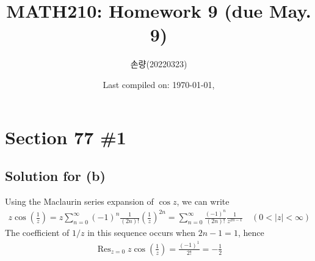 \documentclass{scrartcl}
\title{MATH210: Homework 9 (due May. 9)}
\author{손량(20220323)}
\date{Last compiled on: \today, \currenttime}
\DeclareMathOperator*{\Res}{Res}
\begin{document}
\maketitle

\section{Section 77 \#1}
\subsection{Solution for (b)}
Using the Maclaurin series expansion of \(\cos z\), we can write
\begin{align*}
  z \cos \left( \frac{1}{z} \right)
  = z \sum^\infty_{n = 0} (-1)^n \frac{1}{(2n)!} \left( \frac{1}{z} \right)^{2n}
  = \sum^\infty_{n = 0} \frac{(-1)^n}{(2n)!} \frac{1}{z^{2n - 1}} \quad (0 < |z| < \infty)
\end{align*}
The coefficient of \(1 / z\) in this sequence occurs when \(2n - 1 = 1\), hence
\begin{align*}
  \Res_{z = 0} z \cos \left( \frac{1}{z} \right) = \frac{(-1)^1}{2!} = -\frac{1}{2}
\end{align*}
\end{document}
